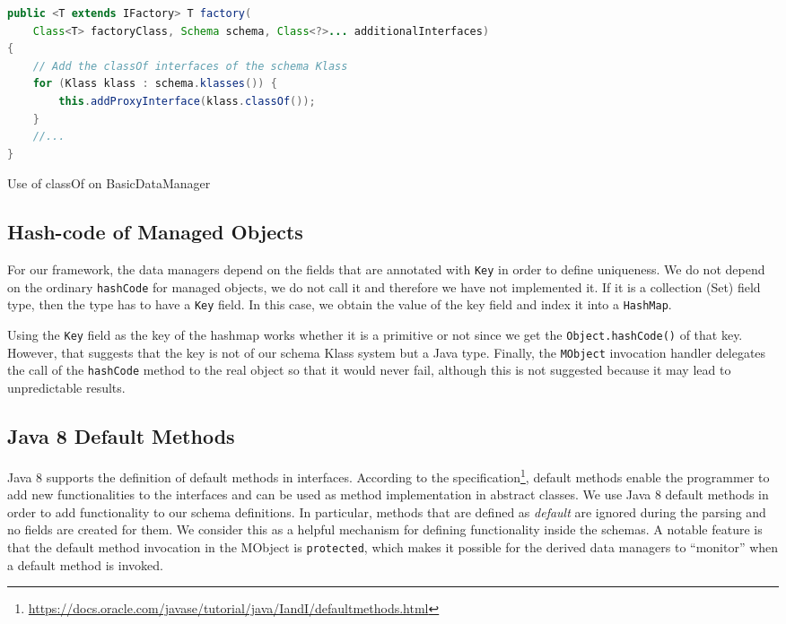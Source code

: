 \begin{sourcecode} [H]
	\begin{lstlisting}[language=Java, escapechar=|]
public <T extends IFactory> T factory(
	Class<T> factoryClass, Schema schema, Class<?>... additionalInterfaces) 
{
	// Add the classOf interfaces of the schema Klass
	for (Klass klass : schema.klasses()) {
		this.addProxyInterface(klass.classOf());
	}
	//...	
}
	\end{lstlisting}
	\caption{Use of classOf on BasicDataManager}
	\label{lst:classOf}
\end{sourcecode}

\subsection{Hash-code of Managed Objects}\label{Hashcode of Managed Objects}
For our framework, the data managers depend on the fields that are annotated with \texttt{Key} in order to define uniqueness.
We do not depend on the ordinary \texttt{hashCode} for managed objects, we do not call it and therefore we have not implemented it.
If it is a collection (Set) field type, then the type has to have a \texttt{Key} field. 
In this case, we obtain the value of the key field and index it into a \texttt{HashMap}. 

Using the \texttt{Key} field as the key of the hashmap works whether it is a primitive or not since we get the \texttt{Object.hashCode()} of that key.
However, that suggests that the key is not of our schema Klass system but a Java type.
Finally, the \texttt{MObject} invocation handler delegates the call of the \texttt{hashCode} method to the real object so that it would never fail, although this is not suggested because it may lead to unpredictable results.

\subsection{Java 8 Default Methods}\label{Java 8 Default Methods}
Java 8 supports the definition of default methods in interfaces.
According to the specification\footnote{\url{https://docs.oracle.com/javase/tutorial/java/IandI/defaultmethods.html}}, default methods enable the programmer to add new functionalities to the interfaces and can be used as method implementation in abstract classes.
We use Java 8 default methods in order to add functionality to our schema definitions. 
In particular, methods that are defined as \textit{default} are ignored during the parsing and no fields are created for them.
We consider this as a helpful mechanism for defining functionality inside the schemas.
A notable feature is that the default method invocation in the MObject is \texttt{protected}, which makes it possible for the derived data managers to ``monitor'' when a default method is invoked.

